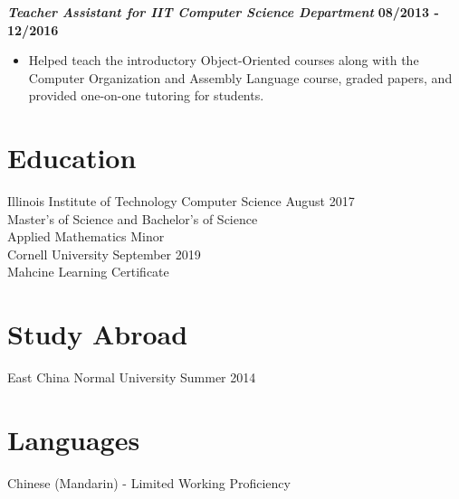 \documentclass[10pt]{res}
\begin{document}
\begin{resume}
	\textbf{\textit{Teacher Assistant for IIT Computer Science Department}} 
	\vspace*{.25em}
	\hfill {\bf 08/2013 - 12/2016}
	\begin{itemize}
	  \item Helped teach the introductory Object-Oriented courses along with the Computer Organization and Assembly Language course, graded papers, and provided one-on-one tutoring for students. 
	\end{itemize}
	
	\section{Education}
	Illinois Institute of Technology \hfill
	{\centering Computer Science} 
	 \hfill August 2017 \\
	Master's of Science and Bachelor's of Science \\
	Applied Mathematics Minor \\
	\newline
	\newline
	Cornell University \hfill September 2019 \\
	Mahcine Learning Certificate
	
	\section{Study Abroad}
	East China Normal University \hfill Summer 2014  
	
	\section{Languages}
	Chinese (Mandarin) - Limited Working Proficiency
\end{resume}
\end{document}

